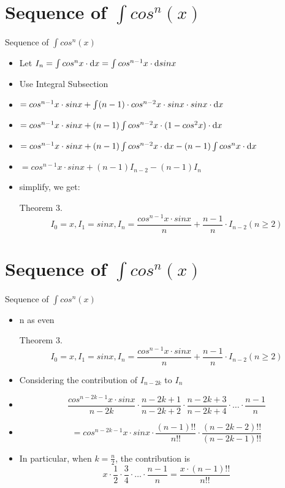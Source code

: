 \documentclass[11pt, thmnum, eqsecnum, allcites, dark]{mathbeamer}
\begin{document}
\section{Sequence of $\int cos^n(x)$}
\begin{frame}{Sequence of $\int cos^n(x)$}
\begin{itemize}[<+->]
\item Let $I_n = \int cos^nx \cdot {\rm d}x = \int cos^{n-1}x \cdot {\rm d}sinx$
\item Use Integral Subsection
\item $ = cos^{n-1}x \cdot sinx + \int (n-1) \cdot cos^{n-2}x \cdot sinx \cdot sinx \cdot {\rm d}x$
\item $ = cos^{n-1}x \cdot sinx + (n-1) \int cos^{n-2}x \cdot (1-cos^2x) \cdot {\rm d}x$
\item $ = cos^{n-1}x \cdot sinx + (n-1) \int cos^{n-2}x \cdot {\rm d}x - (n-1) \int cos^{n}x \cdot {\rm d}x$
\item $ = cos^{n-1}x \cdot sinx + (n-1) I_{n-2} - (n-1) I_n$
\item simplify, we get:
  \begin{block}{Theorem 3.}
 $$I_0 = x, I_1 = sinx, I_n = \frac{cos^{n-1}x \cdot sinx}{n} + \frac{n-1}{n} \cdot I_{n-2} (n \geq 2)$$
  \end{block}
\end{itemize}
\end{frame}

\section{Sequence of $\int cos^n(x)$}
\begin{frame}{Sequence of $\int cos^n(x)$}
\begin{itemize}[<+->]
\item n as even
  \begin{block}{Theorem 3.}
 $$I_0 = x, I_1 = sinx, I_n = \frac{cos^{n-1}x \cdot sinx}{n} + \frac{n-1}{n} \cdot I_{n-2} (n \geq 2)$$
  \end{block}
\item Considering the contribution of $I_{n-2k}$ to $I_n$
\item $$\frac{cos^{n-2k-1}x \cdot sinx}{n-2k} \cdot \frac{n-2k+1}{n-2k+2} \cdot \frac{n-2k+3}{n-2k+4} \cdot \ldots \cdot \frac{n-1}{n}$$
\item $$=cos^{n-2k-1}x \cdot sinx \cdot \frac{(n-1)!!}{n!!} \cdot \frac{(n-2k-2)!!}{(n-2k-1)!!}$$
\item In particular, when $k=\frac{n}{2}$, the contribution is $$x \cdot \frac{1}{2} \cdot \frac{3}{4} \cdot \ldots \cdot\frac{n-1}{n} = \frac{x \cdot (n-1)!!}{n!!} $$
\end{itemize}
\end{frame}
\end{document}
